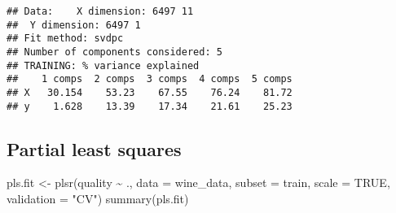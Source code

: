 \documentclass[
]{article}
\newenvironment{Shaded}{\begin{snugshade}}{\end{snugshade}}
\newcommand{\AttributeTok}[1]{\textcolor[rgb]{0.77,0.63,0.00}{#1}}
\newcommand{\ConstantTok}[1]{\textcolor[rgb]{0.00,0.00,0.00}{#1}}
\newcommand{\DecValTok}[1]{\textcolor[rgb]{0.00,0.00,0.81}{#1}}
\newcommand{\FunctionTok}[1]{\textcolor[rgb]{0.00,0.00,0.00}{#1}}
\newcommand{\NormalTok}[1]{#1}
\newcommand{\OtherTok}[1]{\textcolor[rgb]{0.56,0.35,0.01}{#1}}
\newcommand{\SpecialCharTok}[1]{\textcolor[rgb]{0.00,0.00,0.00}{#1}}
\newcommand{\StringTok}[1]{\textcolor[rgb]{0.31,0.60,0.02}{#1}}
\begin{document}
\begin{verbatim}
## Data:    X dimension: 6497 11 
##  Y dimension: 6497 1
## Fit method: svdpc
## Number of components considered: 5
## TRAINING: % variance explained
##    1 comps  2 comps  3 comps  4 comps  5 comps
## X   30.154    53.23    67.55    76.24    81.72
## y    1.628    13.39    17.34    21.61    25.23
\end{verbatim}

\hypertarget{partial-least-squares}{%
\subsection{Partial least squares}\label{partial-least-squares}}

\begin{Shaded}
\end{Shaded}

\begin{Shaded}
\begin{Highlighting}[]
\NormalTok{pls.fit }\OtherTok{\textless{}{-}} \FunctionTok{plsr}\NormalTok{(quality }\SpecialCharTok{\textasciitilde{}}\NormalTok{ ., }\AttributeTok{data =}\NormalTok{ wine\_data, }\AttributeTok{subset =}\NormalTok{ train, }\AttributeTok{scale =} \ConstantTok{TRUE}\NormalTok{, }\AttributeTok{validation =} \StringTok{"CV"}\NormalTok{)}
\FunctionTok{summary}\NormalTok{(pls.fit)}
\end{Highlighting}
\end{Shaded}
\end{document}
